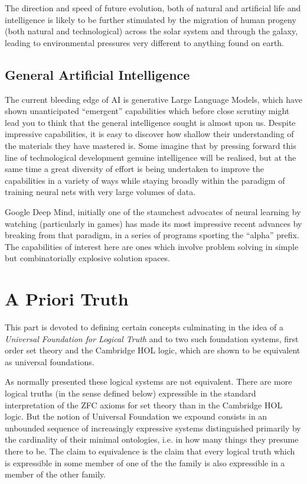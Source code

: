 \documentclass[10pt,titlepage]{book}
\begin{document}
The direction and speed of future evolution, both of natural and artificial life and intelligence is likely to be further stimulated by the migration of human progeny (both natural and technological) across the solar system and through the galaxy, leading to environmental pressures very different to anything found on earth.

\section{General Artificial Intelligence}

The current bleeding edge of AI is generative Large Language Models, which have shown unanticipated ``emergent'' capabilities which before close scrutiny might lead you to think that the general intelligence sought is almost upon us.
Despite impressive capabilities, it is easy to discover how shallow their understanding of the materials they have mastered is.
Some imagine that by pressing forward this line of technological development genuine intelligence will be realised, but at the same time a great diversity of effort is being undertaken to improve the capabilities in a variety of ways while staying broadly within the paradigm of training neural nets with very large volumes of data.

Google Deep Mind, initially one of the staunchest advocates of neural learning by watching (particularly in games) has made its most impressive recent advances by breaking from that paradigm, in a series of programs sporting the ``alpha'' prefix.
The capabilities of interest here are ones which involve problem solving in simple but combinatorially explosive solution spaces.

\chapter{A Priori Truth}

This part is devoted to defining certain concepts culminating in the idea of a \emph{Universal Foundation for Logical Truth} and to two such foundation systems, first order set theory and the Cambridge HOL logic, which are shown to be equivalent as universal foundations.

As normally presented these logical systems are not equivalent.
There are more logical truths (in the sense defined below) expressible in the standard interpretation of the ZFC axioms for set theory than in the Cambridge HOL logic.
But the notion of Universal Foundation we expound consists in an unbounded sequence of increasingly expressive systems distinguished primarily by the cardinality of their minimal ontologies, i.e. in how many things they presume there to be.
The claim to equivalence is the claim that every logical truth which is expressible in some member of one of the the family is also expressible in a member of the other family.
\end{document}
